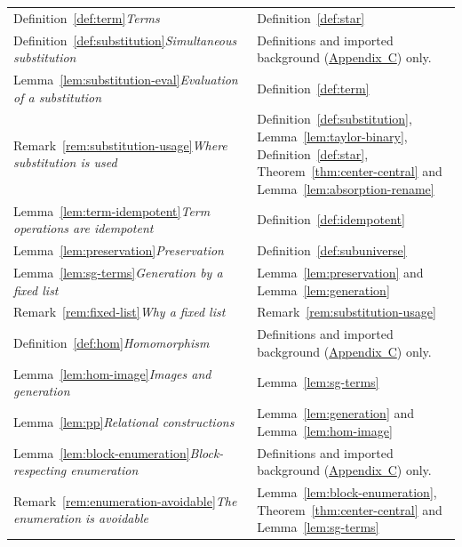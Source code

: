 \documentclass[11pt]{article}
\theoremstyle{mainplain}
\theoremstyle{mainroman}
\theoremstyle{definition}
\numberwithin{equation}{section}
\begin{document}
\begin{longtable}{@{}>{\raggedright\arraybackslash}p{}>{\raggedright\arraybackslash}p{}@{}}
Definition~\ref{def:term}\newline\emph{Terms} & Definition~\ref{def:star} \\
Definition~\ref{def:substitution}\newline\emph{Simultaneous substitution} & Definitions and imported background (\hyperref[app:background]{Appendix~C}) only. \\
Lemma~\ref{lem:substitution-eval}\newline\emph{Evaluation of a substitution} & Definition~\ref{def:term} \\
Remark~\ref{rem:substitution-usage}\newline\emph{Where substitution is used} & Definition~\ref{def:substitution}, Lemma~\ref{lem:taylor-binary}, Definition~\ref{def:star}, Theorem~\ref{thm:center-central} and Lemma~\ref{lem:absorption-rename} \\
Lemma~\ref{lem:term-idempotent}\newline\emph{Term operations are idempotent} & Definition~\ref{def:idempotent} \\
Lemma~\ref{lem:preservation}\newline\emph{Preservation} & Definition~\ref{def:subuniverse} \\
Lemma~\ref{lem:sg-terms}\newline\emph{Generation by a fixed list} & Lemma~\ref{lem:preservation} and Lemma~\ref{lem:generation} \\
Remark~\ref{rem:fixed-list}\newline\emph{Why a fixed list} & Remark~\ref{rem:substitution-usage} \\
Definition~\ref{def:hom}\newline\emph{Homomorphism} & Definitions and imported background (\hyperref[app:background]{Appendix~C}) only. \\
Lemma~\ref{lem:hom-image}\newline\emph{Images and generation} & Lemma~\ref{lem:sg-terms} \\
Lemma~\ref{lem:pp}\newline\emph{Relational constructions} & Lemma~\ref{lem:generation} and Lemma~\ref{lem:hom-image} \\
Lemma~\ref{lem:block-enumeration}\newline\emph{Block-respecting enumeration} & Definitions and imported background (\hyperref[app:background]{Appendix~C}) only. \\
Remark~\ref{rem:enumeration-avoidable}\newline\emph{The enumeration is avoidable} & Lemma~\ref{lem:block-enumeration}, Theorem~\ref{thm:center-central} and Lemma~\ref{lem:sg-terms} \\

\end{longtable}
\end{document}
